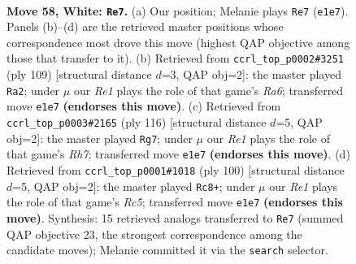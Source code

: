 \documentclass[11pt]{article}
\begin{document}
\clearpage

\begin{figure}[p]\centering
\begin{subfigure}{0.46\textwidth}\centering
\resizebox{\linewidth}{!}{%
\newchessgame
\chessboard[
  setfen={5r1k/8/P7/8/8/7K/8/4R3 w - - 1 58},
  showmover=false,
  pgfstyle=straightmove, color=movearrow, markmove={e1-e7}
]}
\caption{}
\end{subfigure}\hfill
\begin{subfigure}{0.46\textwidth}\centering
\resizebox{\linewidth}{!}{%
\newchessgame
\chessboard[
  setfen={8/8/4k3/7p/7P/r7/8/5R1K b - - 0 55},
  showmover=false,
  pgfstyle=straightmove, color=movearrow, markmove={a3-a2}
]}
\caption{}
\end{subfigure}
\\[4pt]
\begin{subfigure}{0.46\textwidth}\centering
\resizebox{\linewidth}{!}{%
\newchessgame
\chessboard[
  setfen={4k3/7R/4r3/3p4/3P4/5K2/8/8 w - - 5 59},
  showmover=false,
  pgfstyle=straightmove, color=movearrow, markmove={h7-g7}
]}
\caption{}
\end{subfigure}\hfill
\begin{subfigure}{0.46\textwidth}\centering
\resizebox{\linewidth}{!}{%
\newchessgame
\chessboard[
  setfen={6k1/8/6r1/2R5/8/1P2n3/8/7K w - - 0 51},
  showmover=false,
  pgfstyle=straightmove, color=movearrow, markmove={c5-c8}
]}
\caption{}
\end{subfigure}
\caption{\textbf{Move 58, White: \texttt{Re7}.} (a) Our position; Melanie plays \texttt{Re7} (\texttt{e1e7}). Panels (b)--(d) are the retrieved master positions whose correspondence most drove this move (highest QAP objective among those that transfer to it). (b) Retrieved from \texttt{ccrl\_top\_p0002\#3251} (ply 109) [structural distance $d$=3, QAP obj=2]: the master played \texttt{Ra2}; under $\mu$ our \emph{Re1} plays the role of that game's \emph{Ra6}; transferred move \texttt{e1e7} \textbf{(endorses this move)}. (c) Retrieved from \texttt{ccrl\_top\_p0003\#2165} (ply 116) [structural distance $d$=5, QAP obj=2]: the master played \texttt{Rg7}; under $\mu$ our \emph{Re1} plays the role of that game's \emph{Rh7}; transferred move \texttt{e1e7} \textbf{(endorses this move)}. (d) Retrieved from \texttt{ccrl\_top\_p0001\#1018} (ply 100) [structural distance $d$=5, QAP obj=2]: the master played \texttt{Rc8+}; under $\mu$ our \emph{Re1} plays the role of that game's \emph{Rc5}; transferred move \texttt{e1e7} \textbf{(endorses this move)}. Synthesis: 15 retrieved analogs transferred to \texttt{Re7} (summed QAP objective 23, the strongest correspondence among the candidate moves); Melanie committed it via the \texttt{search} selector.}
\label{fig:thought-m114}
\end{figure}
\end{document}
